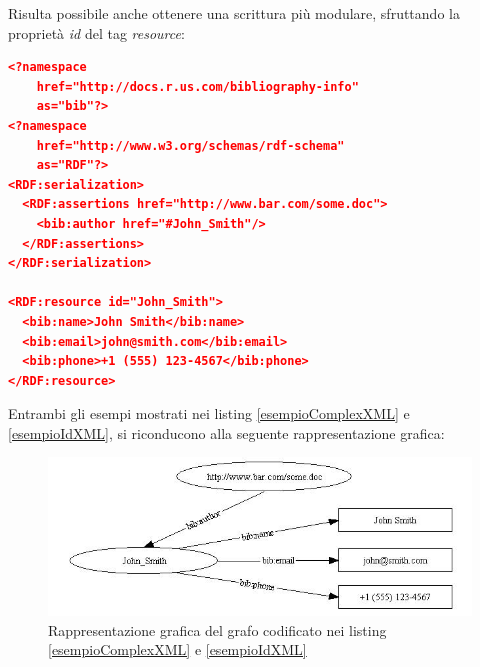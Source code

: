 \documentclass[12pt,a4paper,twoside]{book}
\begin{document}
Risulta possibile anche ottenere una scrittura più modulare, sfruttando la proprietà \textit{id} del tag \textit{resource}:
\begin{lstlisting}[language=json,firstnumber=1,caption={Esempio di metadato conforme ad RDF in XML},captionpos=b,label=esempioIdXML]
<?namespace 
	href="http://docs.r.us.com/bibliography-info" 
	as="bib"?> 
<?namespace 
	href="http://www.w3.org/schemas/rdf-schema"
	as="RDF"?> 
<RDF:serialization> 
  <RDF:assertions href="http://www.bar.com/some.doc"> 
    <bib:author href="#John_Smith"/> 
  </RDF:assertions> 
</RDF:serialization>

<RDF:resource id="John_Smith"> 
  <bib:name>John Smith</bib:name> 
  <bib:email>john@smith.com</bib:email> 
  <bib:phone>+1 (555) 123-4567</bib:phone> 
</RDF:resource> 
\end{lstlisting}
Entrambi gli esempi mostrati nei listing \ref{esempioComplexXML} e \ref{esempioIdXML}, si riconducono alla seguente rappresentazione grafica:
\begin{figure}[H]
\centering
\includegraphics[scale=.50]{../immagini/complexXML.jpg}
\caption{Rappresentazione grafica del grafo codificato nei listing \ref{esempioComplexXML} e \ref{esempioIdXML}}
\label{imgEsempioComplexXML}
\end{figure}
\end{document}
